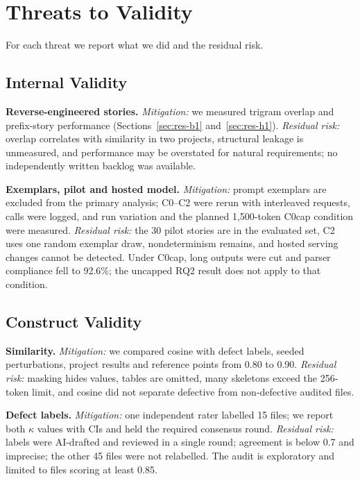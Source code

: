 \section{Threats to Validity}
\label{sec:threats}

For each threat we report what we did and the residual risk.

\subsection{Internal Validity}

\textbf{Reverse-engineered stories.} \emph{Mitigation:} we measured trigram overlap and prefix-story performance (Sections~\ref{sec:res-b1} and~\ref{sec:res-h1}). \emph{Residual risk:} overlap correlates with similarity in two projects, structural leakage is unmeasured, and performance may be overstated for natural requirements; no independently written backlog was available.

\textbf{Exemplars, pilot and hosted model.} \emph{Mitigation:} prompt exemplars are excluded from the primary analysis; C0--C2 were rerun with interleaved requests, calls were logged, and run variation and the planned 1,500-token C0cap condition were measured. \emph{Residual risk:} the 30 pilot stories are in the evaluated set, C2 uses one random exemplar draw, nondeterminism remains, and hosted serving changes cannot be detected. Under C0cap, long outputs were cut and parser compliance fell to 92.6\%; the uncapped RQ2 result does not apply to that condition.

\subsection{Construct Validity}

\textbf{Similarity.} \emph{Mitigation:} we compared cosine with defect labels, seeded perturbations, project results and reference points from 0.80 to 0.90. \emph{Residual risk:} masking hides values, tables are omitted, many skeletons exceed the 256-token limit, and cosine did not separate defective from non-defective audited files.

\textbf{Defect labels.} \emph{Mitigation:} one independent rater labelled 15 files; we report both $\kappa$ values with CIs and held the required consensus round. \emph{Residual risk:} labels were AI-drafted and reviewed in a single round; agreement is below 0.7 and imprecise; the other 45 files were not relabelled. The audit is exploratory and limited to files scoring at least 0.85.

